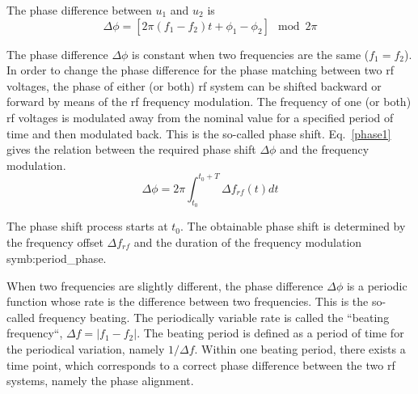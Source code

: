 The phase difference between $u_1$ and $u_2$ is
\begin{equation}
	\Delta \phi=[2\pi(f_1-f_2)t+\phi_1-\phi_2] \mod 2\pi\label{phase_diff_general}
\end{equation}

The phase difference $\Delta \phi$ is constant when two frequencies are the same ($f_1=f_2$). In order to change the phase difference for the phase matching between two rf voltages, the phase of either (or both) rf system can be shifted backward or forward by means of the rf frequency modulation. The frequency of one (or both) rf voltages is modulated away from the nominal value for a specified period of time and then modulated back. This is the so-called phase shift. Eq.~\ref{phase1} gives the relation between the required phase shift $\Delta \phi$ and the frequency modulation. 
\begin{equation}
\Delta \phi= 2\pi \int_{t_0}^{t_0+T} \Delta f_\mathit{rf}(t)dt \label{phase1}
\end{equation}

The phase shift process starts at $t_0$. The obtainable phase shift is determined by the frequency offset $\Delta f_\mathit{rf}$ and the duration of the frequency modulation \gls{symb:period_phase}. 

When two frequencies are slightly different, the phase difference $\Delta \phi$ is a periodic function whose rate is the difference between two frequencies. This is the so-called frequency beating. The periodically variable rate is called the ``beating frequency``, $\Delta f=|f_1-f_2|$. The beating period is defined as a period of time for the periodical variation, namely $1/\Delta f$. Within one beating period, there exists a time point, which corresponds to a correct phase difference between the two rf systems, namely the phase alignment. 

